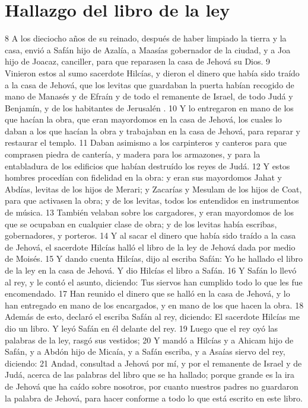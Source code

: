 \section*{Hallazgo del libro de la ley }

 
8 A los dieciocho años de su reinado, después de haber limpiado la tierra y la casa, envió a Safán hijo de Azalía, a Maasías gobernador de la ciudad, y a Joa hijo de Joacaz, canciller, para que reparasen la casa de Jehová su Dios.
9 Vinieron estos al sumo sacerdote Hilcías, y dieron el dinero que había sido traído a la casa de Jehová, que los levitas que guardaban la puerta habían recogido de mano de Manasés y de Efraín y de todo el remanente de Israel, de todo Judá y Benjamín, y de los habitantes de Jerusalén .
10 Y lo entregaron en mano de los que hacían la obra, que eran mayordomos en la casa de Jehová, los cuales lo daban a los que hacían la obra y trabajaban en la casa de Jehová, para reparar y restaurar el templo.
11 Daban asimismo a los carpinteros y canteros para que comprasen piedra de cantería, y madera para los armazones, y para la entabladura de los edificios que habían destruído los reyes de Judá.
12 Y estos hombres procedían con fidelidad en la obra: y eran sus mayordomos Jahat y Abdías, levitas de los hijos de Merari; y Zacarías y Mesulam de los hijos de Coat, para que activasen la obra; y de los levitas, todos los entendidos en instrumentos de música.
13 También velaban sobre los cargadores, y eran mayordomos de los que se ocupaban en cualquier clase de obra; y de los levitas había escribas, gobernadores, y porteros.
14 Y al sacar el dinero que había sido traído a la casa de Jehová, el sacerdote Hilcías halló el libro de la ley de Jehová dada por medio de Moisés.
15 Y dando cuenta Hilcías, dijo al escriba Safán: Yo he hallado el libro de la ley en la casa de Jehová. Y dio Hilcías el libro a Safán.
16 Y Safán lo llevó al rey, y le contó el asunto, diciendo: Tus siervos han cumplido todo lo que les fue encomendado.
17 Han reunido el dinero que se halló en la casa de Jehová, y lo han entregado en mano de los encargados, y en mano de los que hacen la obra.
18 Además de esto, declaró el escriba Safán al rey, diciendo: El sacerdote Hilcías me dio un libro. Y leyó Safán en él delante del rey.
19 Luego que el rey oyó las palabras de la ley, rasgó sus vestidos;
20 Y mandó a Hilcías y a Ahicam hijo de Safán, y a Abdón hijo de Micaía, y a Safán escriba, y a Asaías siervo del rey, diciendo:
21 Andad, consultad a Jehová por mí, y por el remanente de Israel y de Judá, acerca de las palabras del libro que se ha hallado; porque grande es la ira de Jehová que ha caído sobre nosotros, por cuanto nuestros padres no guardaron la palabra de Jehová, para hacer conforme a todo lo que está escrito en este libro.
